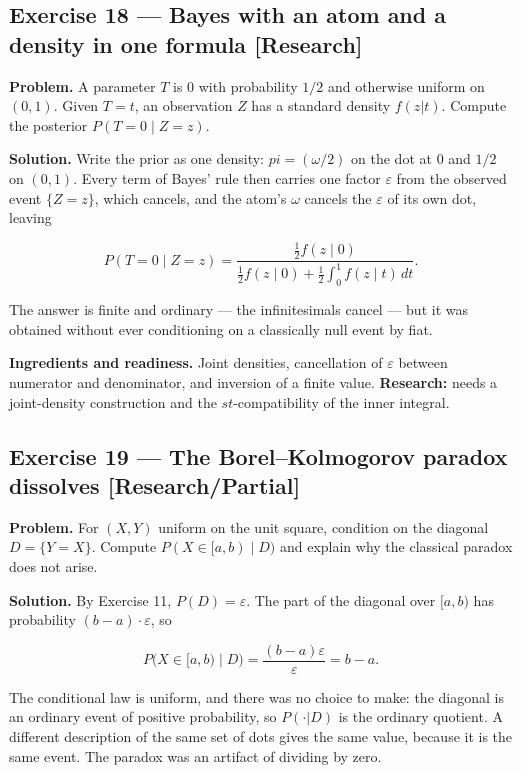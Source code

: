 \documentclass[11pt]{article}
\newcommand{\eps}{\varepsilon}
\renewcommand{\epsilon}{\varepsilon}
\begin{document}
\subsection*{Exercise 18 --- Bayes with an atom and a density in one formula \hfill \normalfont\small[Research]}

\textbf{Problem.} A parameter $T$ is $0$ with probability $1/2$ and otherwise
uniform on $(0,1)$. Given $T = t$, an observation $Z$ has a standard density
$f(z | t)$. Compute the posterior $P(T = 0\mid Z = z)$.

\textbf{Solution.} Write the prior as one density: $pi = (\omega/2)$ on the dot at
$0$ and $1/2$ on $(0,1)$. Every term of Bayes' rule then carries one factor
$\eps$ from the observed event $\{Z = z\}$, which cancels, and the atom's
$\omega$ cancels the $\eps$ of its own dot, leaving

\[
P(T=0\mid Z=z)
=\frac{\tfrac12 f(z\mid 0)}
       {\tfrac12 f(z\mid 0)+\tfrac12\int_0^1 f(z\mid t)\,dt } .
\]

The answer is finite and ordinary --- the infinitesimals cancel --- but it was
obtained without ever conditioning on a classically null event by fiat.

\textbf{Ingredients and readiness.} Joint densities, cancellation of $\eps$
between numerator and denominator, and inversion of a finite value.
\textbf{Research:} needs a joint-density construction and the $st$-compatibility of
the inner integral.


\subsection*{Exercise 19 --- The Borel--Kolmogorov paradox dissolves \hfill \normalfont\small[Research/Partial]}

\textbf{Problem.} For $(X,Y)$ uniform on the unit square, condition on the diagonal
$D = \{Y = X\}$. Compute $P(X\in [a,b)\mid D)$ and explain why the classical
paradox does not arise.

\textbf{Solution.} By Exercise 11, $P(D) = \eps$. The part of the diagonal over
$[a,b)$ has probability $(b-a)\cdot \eps$, so

\[
P\big(X\in[a,b)\mid D\big)=\frac{(b-a)\epsilon}{\epsilon}=b-a .
\]

The conditional law is uniform, and there was no choice to make: the diagonal
is an ordinary event of positive probability, so $P(·|D)$ is the ordinary
quotient. A different description of the same set of dots gives the same
value, because it is the same event. The paradox was an artifact of dividing
by zero.
\end{document}
